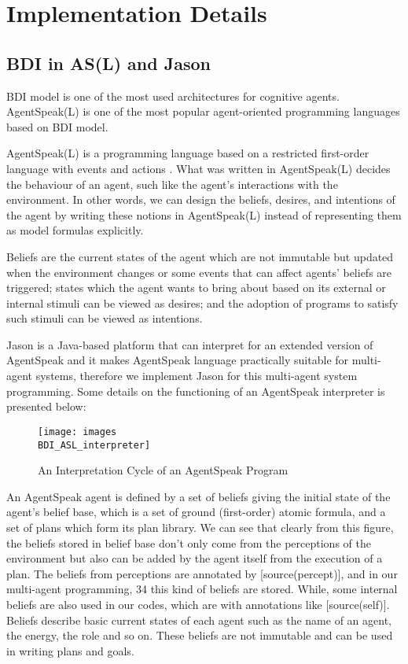\section{Implementation Details}
\subsection{BDI in AS(L) and Jason}

BDI model is one of the most used architectures for cognitive agents. AgentSpeak(L) is one of the most popular agent-oriented programming languages based on BDI model.

AgentSpeak(L) is a programming language based on a restricted first-order language with events and actions \cite{anand_AgentSpeak_1996}. What was written in AgentSpeak(L) decides the behaviour of an agent, such like the agent's interactions with the environment. In other words, we can design the beliefs, desires, and intentions of the agent by writing these notions in AgentSpeak(L) instead of representing them as model formulas explicitly.

Beliefs are the current states of the agent which are not immutable but updated when the environment changes or some events that can affect agents' beliefs are triggered; states which the agent wants to bring about based on its external or internal stimuli can be viewed as desires; and the adoption of programs to satisfy such stimuli can be viewed as intentions\cite{anand_AgentSpeak_1996}. 

Jason is a Java-based platform that can interpret for an extended version of AgentSpeak and it makes AgentSpeak language practically suitable for multi-agent systems, therefore we implement Jason for this multi-agent system programming. Some details on the functioning of an AgentSpeak interpreter is presented below:

\begin{figure}[H]
\centering
\begin{minipage}[!htbp]{\linewidth}
\texttt{[image: images\\BDI\_ASL\_interpreter]}
\caption{An Interpretation Cycle of an AgentSpeak Program\cite{rafael_BDIAgent_2005}}
\label{fig:ASL_interpreter}
\end{minipage}
\end{figure}


An AgentSpeak agent is defined by a set of beliefs giving the initial state of the agent’s belief base, which is a set of ground (first-order) atomic formula, and a set of plans which form its plan library\cite{rafael_BDIAgent_2005}. We can see that clearly from this figure, the beliefs stored in belief base don't only come from the perceptions of the environment but also can be added by the agent itself from the execution of a plan. The beliefs from perceptions are annotated by [source(percept)], and in our multi-agent programming, 34 this kind of beliefs are stored. While, some internal beliefs are also used in our codes, which are with annotations like [source(self)]. Beliefs describe basic current states of each agent such as the name of an agent, the energy, the role and so on.  These beliefs are not immutable and can be used in writing plans and goals. 

